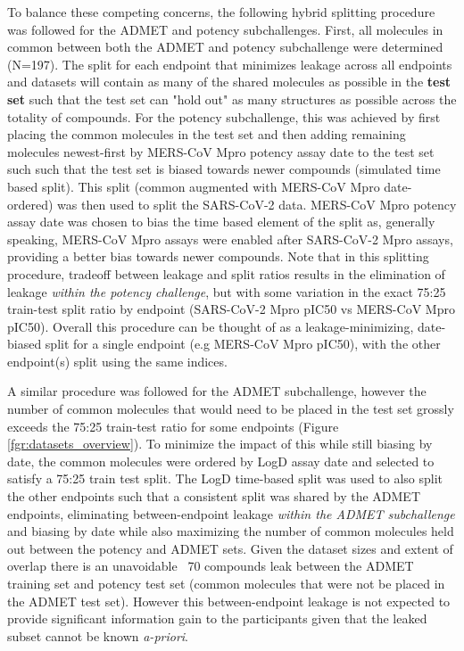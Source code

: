 \documentclass[journal=jcim,manuscript=article]{achemso}
\begin{document}
To balance these competing concerns, the following hybrid splitting procedure was followed for the ADMET and potency subchallenges. First, all molecules in common between both the ADMET and potency subchallenge were determined (N=197). The split for each endpoint that minimizes leakage across all endpoints and datasets will contain as many of the shared molecules as possible in the \textbf{test set} such that the test set can "hold out" as many structures as possible across the totality of compounds. For the potency subchallenge, this was achieved by first placing the common molecules in the test set and then adding remaining molecules newest-first by MERS-CoV Mpro potency assay date to the test set such such that the test set is biased towards newer compounds (simulated time based split). This split (common augmented with MERS-CoV Mpro date-ordered) was then used to split the SARS-CoV-2 data. MERS-CoV Mpro potency assay date was chosen to bias the time based element of the split as, generally speaking, MERS-CoV Mpro assays were enabled after SARS-CoV-2 Mpro assays, providing a better bias towards newer compounds. Note that in this splitting procedure, tradeoff between leakage and split ratios results in the elimination of leakage \textit{within the potency challenge}, but with some variation in the exact 75:25 train-test split ratio by endpoint (SARS-CoV-2 Mpro pIC50 vs MERS-CoV Mpro pIC50). Overall this procedure can be thought of as a leakage-minimizing, date-biased split for a single endpoint (e.g MERS-CoV Mpro pIC50), with the other endpoint(s) split using the same indices.

A similar procedure was followed for the ADMET subchallenge, however the number of common molecules that would need to be placed in the test set grossly exceeds the 75:25 train-test ratio for some endpoints (Figure \ref{fgr:datasets_overview}). To minimize the impact of this while still biasing by date, the common molecules were ordered by LogD assay date and selected to satisfy a 75:25 train test split. The LogD time-based split was used to also split the other endpoints such that a consistent split was shared by the ADMET endpoints, eliminating between-endpoint leakage \textit{within the ADMET subchallenge} and biasing by date while also maximizing the number of common molecules held out between the potency and ADMET sets. Given the dataset sizes and extent of overlap there is an unavoidable ~70 compounds leak between the ADMET training set and potency test set (common molecules that were not be placed in the ADMET test set). However this between-endpoint leakage is not expected to provide significant information gain to the participants given that the leaked subset cannot be known \textit{a-priori}.
\end{document}
